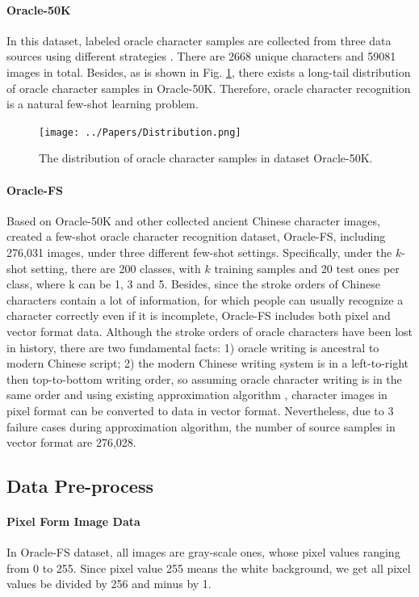 \documentclass{article}
\begin{document}
\paragraph{Oracle-50K}
In this dataset, labeled oracle character samples are collected  from three data sources using different strategies \citep{Orc-BERT}. There are 2668 unique characters and 59081 images in total. Besides, as is shown in Fig. \ref{fig:distribution}, there exists a long-tail distribution of oracle character samples in Oracle-50K. Therefore, oracle character recognition is a natural few-shot learning problem.

\begin{figure}[h]
	\centering
	\texttt{[image: ../Papers/Distribution.png]}
	\caption{The distribution of oracle character samples in dataset Oracle-50K.}
	\label{fig:distribution}
\end{figure}

\paragraph{Oracle-FS}
Based on Oracle-50K and other collected ancient Chinese character images, \cite{Orc-BERT} created a few-shot oracle character recognition dataset, Oracle-FS, including 276,031 images, under three different few-shot settings. 
Specifically, under the $k$-shot setting, there are 200 classes, with $k$ training samples and 20 test ones per class, where k can be 1, 3 and 5.
Besides, since the stroke orders of Chinese characters contain a lot of information, for which people can usually recognize a character correctly even if it is incomplete, Oracle-FS includes both pixel and vector format data.
Although the stroke orders of oracle characters have been lost in history, there are two fundamental facts: 1) oracle writing is ancestral to modern Chinese script; 2) the modern Chinese writing system is in a left-to-right then top-to-bottom writing order, so assuming oracle character writing is in the same order and using existing approximation algorithm \citep{Handwriting}, character images in pixel format can be converted to data in vector format.  
Nevertheless, due to 3 failure cases during approximation algorithm, the number of source samples in vector format are 276,028.

\subsection{Data Pre-process}

\paragraph{Pixel Form Image Data}
In Oracle-FS dataset, all images are gray-scale ones, whose pixel values ranging from 0 to 255. Since pixel value 255 means the white background, we get all pixel values be divided by 256 and minus by 1.
\end{document}
